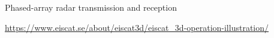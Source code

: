 \begin{frame}[fragile,t]
\frametitle{\hfill}
\MyHeading{\ED}
\vspace{\mytopbit}
{Phased-array radar transmission and reception}

\begin{center}
\end{center}
{\colblack \scriptsize \url{ https://www.eiscat.se/about/eiscat3d/eiscat_3d-operation-illustration/}}
\end{frame}
